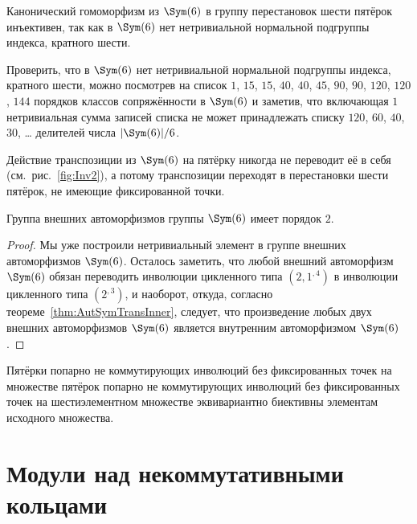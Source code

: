 \documentclass[
	extrafontsizes,
	11pt,
	hyphens,
]{memoir}
\begin{document}
\begin{observation}
Канонический гомоморфизм из \(\Sym(6)\) в группу перестановок шести пятёрок инъективен, так как в \(\Sym(6)\) нет нетривиальной нормальной подгруппы индекса, кратного шести.
\end{observation}

\begin{remark}
Проверить, что в \(\Sym(6)\) нет нетривиальной нормальной подгруппы индекса, кратного шести, можно посмотрев на список
\(1\), \(15\), \(15\), \(40\), \(40\), \(45\), \(90\), \(90\), \(120\), \(120\), \(144\)
порядков классов сопряжённости в \(\Sym(6)\) и заметив, что включающая \(1\) нетривиальная сумма записей списка не может принадлежать списку
\(120\), \(60\), \(40\), \(30\), \dots {}
делителей числа \(\lvert \Sym(6) \rvert / 6\).
\end{remark}

\begin{observation}
Действие транспозиции из \(\Sym(6)\) на пятёрку никогда не переводит её в себя (см.\ рис.\ \ref{fig:Inv2}), а потому транспозиции переходят в перестановки шести пятёрок, не имеющие фиксированной точки.
\end{observation}

\begin{theorem}
Группа внешних автоморфизмов группы \(\Sym(6)\) имеет порядок \(2\).
\end{theorem}

\begin{proof}
Мы уже построили нетривиальный элемент в группе внешних автоморфизмов \(\Sym(6)\).
Осталось заметить, что любой внешний автоморфизм \(\Sym(6)\) обязан переводить инволюции цикленного типа \((2,1^{,4})\) в инволюции цикленного типа \((2^{,3})\), и наоборот, откуда, согласно теореме~\ref{thm:AutSymTransInner}, следует, что произведение любых двух внешних автоморфизмов \(\Sym(6)\) является внутренним автоморфизмом \(\Sym(6)\).
\end{proof}

\begin{observation}
Пятёрки попарно не коммутирующих инволюций без фиксированных точек на множестве пятёрок попарно не коммутирующих инволюций без фиксированных точек на шестиэлементном множестве эквивариантно биективны элементам исходного множества.
\end{observation}




\chapter{Модули над некоммутативными кольцами}
\end{document}
